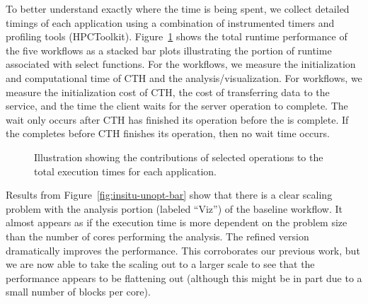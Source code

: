 To better understand exactly where the time is being spent, we collect
detailed timings of each application using a combination of instrumented timers
and profiling tools (HPCToolkit).  Figure~\ref{fig:runtime-individual-bar} shows
the total runtime performance of the five workflows as a stacked bar plots
illustrating the portion of runtime associated with select functions.  For the
\insitu workflows, we measure the initialization and computational time of
CTH and the analysis/visualization.  For \intransit workflows, we measure
the initialization cost of CTH, the cost of transferring data to the service,
and the time the client waits for the server operation to complete. The wait
only occurs after CTH has finished its operation before the \vda is
complete.  If the \vda completes before CTH finishes its operation, then no
wait time occurs.

\begin{figure}[htbp]
\begin{centering}
\vspace{-24pt}

\vspace{-24pt}

\vspace{-24pt}

\caption[Breakdown of operation timings.]{Illustration showing the
contributions of selected operations to the total execution times for each
application.}
\label{fig:runtime-individual-bar}
\end{centering}
\end{figure}


Results from Figure~\ref{fig:insitu-unopt-bar} show that there is a clear
scaling problem with the analysis portion (labeled ``Viz'') of the baseline
\insitu workflow.  It almost appears as if the execution time is more
dependent on the problem size than the number of cores performing the analysis.
The refined version dramatically improves the performance.  This
corroborates our previous work, but we are now able to
take the scaling out to a larger scale to see that the performance appears
to be flattening out (although this might be in part due to a small number
of blocks per core).

